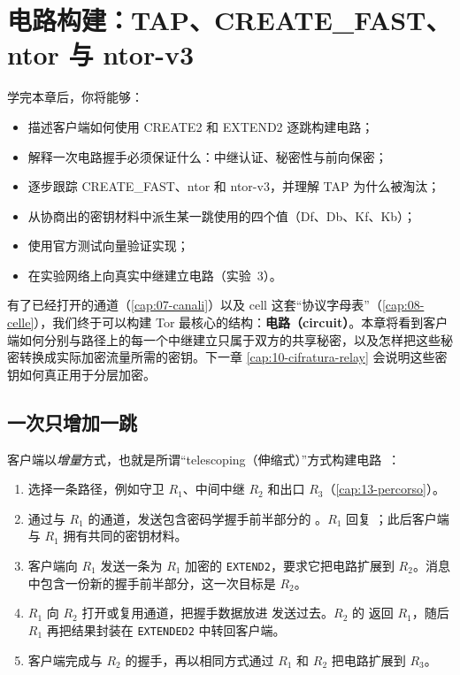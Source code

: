 \chapter{电路构建：TAP、CREATE\_FAST、ntor 与 ntor-v3}\label{cap:09-circuiti}

\begin{obiettivi}
学完本章后，你将能够：
\begin{itemize}[nosep]
  \item 描述客户端如何使用 CREATE2 和 EXTEND2 逐跳构建电路；
  \item 解释一次电路握手必须保证什么：中继认证、秘密性与前向保密；
  \item 逐步跟踪 CREATE\_FAST、ntor 和 ntor-v3，并理解 TAP 为什么被淘汰；
  \item 从协商出的密钥材料中派生某一跳使用的四个值（Df、Db、Kf、Kb）；
  \item 使用官方测试向量验证实现；
  \item 在实验网络上向真实中继建立电路（实验~3）。
\end{itemize}
\end{obiettivi}

有了已经打开的通道（\cref{cap:07-canali}）以及 cell 这套“协议字母表”（\cref{cap:08-celle}），我们终于可以构建 Tor 最核心的结构：\textbf{电路（circuit）}。本章将看到客户端如何分别与路径上的每一个中继建立只属于双方的共享秘密，以及怎样把这些秘密转换成实际加密流量所需的密钥。下一章 \cref{cap:10-cifratura-relay} 会说明这些密钥如何真正用于分层加密。

\section{一次只增加一跳}\label{sec:circ-telescopio}

客户端以\emph{增量}方式，也就是所谓\enquote{telescoping（伸缩式）}方式构建电路~\cite{dingledine2004tor}：
\begin{enumerate}
  \item 选择一条路径，例如守卫 $R_1$、中间中继 $R_2$ 和出口 $R_3$（\cref{cap:13-percorso}）。
  \item 通过与 $R_1$ 的通道，发送包含密码学握手前半部分的 。$R_1$ 回复 ；此后客户端与 $R_1$ 拥有共同的密钥材料。
  \item 客户端向 $R_1$ 发送一条为 $R_1$ 加密的 \texttt{EXTEND2}，要求它把电路扩展到 $R_2$。消息中包含一份新的握手前半部分，这一次目标是 $R_2$。
  \item $R_1$ 向 $R_2$ 打开或复用通道，把握手数据放进  发送过去。$R_2$ 的  返回 $R_1$，随后 $R_1$ 再把结果封装在 \texttt{EXTENDED2} 中转回客户端。
  \item 客户端完成与 $R_2$ 的握手，再以相同方式通过 $R_1$ 和 $R_2$ 把电路扩展到 $R_3$。
\end{enumerate}

